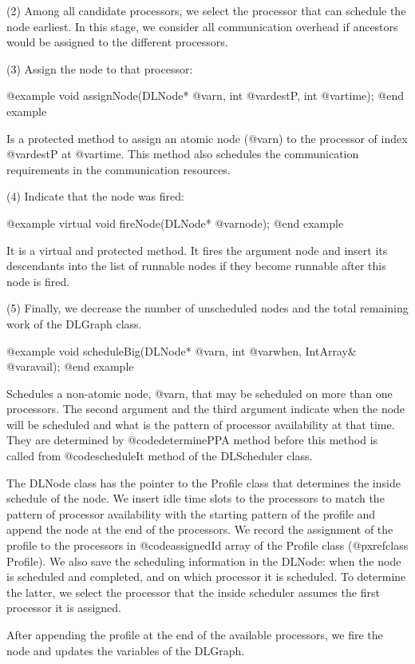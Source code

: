 (2) Among all candidate processors, we select the processor that can schedule
the node earliest. In this stage, we consider all communication overhead
if ancestors would be assigned to the different processors.

(3) Assign the node to that processor:

@example
void assignNode(DLNode* @var{n}, int @var{destP}, int @var{time});
@end example

Is a protected method to assign an atomic node (@var{n}) to the processor
of index @var{destP} at @var{time}. This method also schedules the
communication requirements in the communication resources.

(4) Indicate that the node was fired:

@example
virtual void fireNode(DLNode* @var{node});
@end example

It is a virtual and protected method. It fires the argument node and insert
its descendants into the list of runnable nodes if they become runnable 
after this node is fired.

(5) Finally, we decrease the number of unscheduled nodes and the total
remaining work of the DLGraph class.

@example
void scheduleBig(DLNode* @var{n}, int @var{when}, IntArray& @var{avail});
@end example

Schedules a non-atomic node, @var{n}, that may be scheduled on more than one
processors. The second argument and the third argument indicate when the
node will be scheduled and what is the pattern of processor availability at
that time. They are determined by @code{determinePPA} method before this
method is called from @code{scheduleIt} method of the DLScheduler class.

The DLNode class has the pointer to the Profile class that determines the
inside schedule of the node. We insert idle time slots to the
processors to match the pattern of processor availability with the starting
pattern of the profile and append the node at the end of the processors. 
We record the assignment of the profile to
the processors in @code{assignedId} array of the Profile class
(@pxref{class Profile}). We also save the scheduling information in the
DLNode: when the node is scheduled and completed, and on which processor
it is scheduled. To determine the latter, we select the processor that
the inside scheduler assumes the first processor it is assigned.

After appending the profile at the end of the available processors, we
fire the node and updates the variables of the DLGraph.

